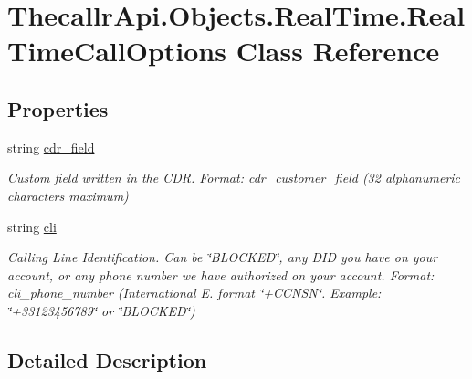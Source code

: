 \hypertarget{class_thecallr_api_1_1_objects_1_1_real_time_1_1_real_time_call_options}{\section{Thecallr\+Api.\+Objects.\+Real\+Time.\+Real\+Time\+Call\+Options Class Reference}
\label{class_thecallr_api_1_1_objects_1_1_real_time_1_1_real_time_call_options}
}


 


\subsection*{Properties}
\begin{DoxyCompactItemize}
\item 
string \hyperlink{class_thecallr_api_1_1_objects_1_1_real_time_1_1_real_time_call_options_a46e7363807c6216dd46bb2d3eb740706}{cdr\+\_\+field}
\begin{DoxyCompactList}\small\item\em Custom field written in the C\+D\+R. Format\+: cdr\+\_\+customer\+\_\+field (32 alphanumeric characters maximum) \end{DoxyCompactList}\item 
string \hyperlink{class_thecallr_api_1_1_objects_1_1_real_time_1_1_real_time_call_options_a1f37dc77ec44c7d4e18d42dda83ceec4}{cli}
\begin{DoxyCompactList}\small\item\em Calling Line Identification. Can be \char`\"{}\+B\+L\+O\+C\+K\+E\+D\char`\"{}, any D\+I\+D you have on your account, or any phone number we have authorized on your account. Format\+: cli\+\_\+phone\+\_\+number (International E. format \char`\"{}+\+C\+C\+N\+S\+N\char`\"{}. Example\+: \char`\"{}+33123456789\char`\"{} or \char`\"{}\+B\+L\+O\+C\+K\+E\+D\char`\"{}) \end{DoxyCompactList}\end{DoxyCompactItemize}


\subsection{Detailed Description}




